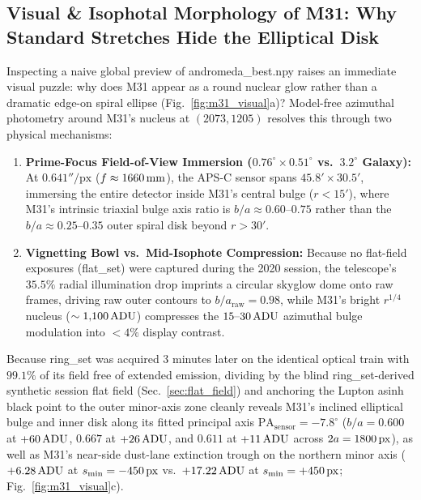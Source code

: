 \documentclass[10pt,twocolumn,letterpaper]{article}
\DeclareRobustCommand{\code}[1]{\texttt{#1}}
\def\code#1{#1}%
\begin{document}
\subsection{Visual \& Isophotal Morphology of M31: Why Standard Stretches Hide the Elliptical Disk}

Inspecting a naive global preview of \code{andromeda\_best.npy} raises an immediate visual puzzle: why does M31 appear as a round nuclear glow rather than a dramatic edge-on spiral ellipse (Fig.~\ref{fig:m31_visual}a)? Model-free azimuthal photometry around M31's nucleus at $(2073, 1205)$ resolves this through two physical mechanisms:
\begin{enumerate}
  \item \textbf{Prime-Focus Field-of-View Immersion ($0.76^\circ \times 0.51^\circ$ vs.\ $3.2^\circ$ Galaxy):} At $0.641''/\text{px}$ ($f \approx 1660\text{\,mm}$), the APS-C sensor spans $45.8' \times 30.5'$, immersing the entire detector inside M31's central bulge ($r < 15'$), where M31's intrinsic triaxial bulge axis ratio is $b/a \approx 0.60\text{--}0.75$ rather than the $b/a \approx 0.25\text{--}0.35$ outer spiral disk beyond $r > 30'$.
  \item \textbf{Vignetting Bowl vs.\ Mid-Isophote Compression:} Because no flat-field exposures (\code{flat\_set}) were captured during the 2020 session, the telescope's $35.5\%$ radial illumination drop imprints a circular skyglow dome onto raw frames, driving raw outer contours to $b/a_{\text{raw}} = 0.98$, while M31's bright $r^{1/4}$ nucleus ($\sim 1{,}100\text{\,ADU}$) compresses the $15\text{--}30\text{\,ADU}$ azimuthal bulge modulation into $<4\%$ display contrast.
\end{enumerate}

Because \code{ring\_set} was acquired 3 minutes later on the identical optical train with $99.1\%$ of its field free of extended emission, dividing by the blind \code{ring\_set}-derived synthetic session flat field (Sec.~\ref{sec:flat_field}) and anchoring the Lupton \code{asinh} black point to the outer minor-axis zone cleanly reveals M31's inclined elliptical bulge and inner disk along its fitted principal axis $\text{PA}_{\text{sensor}} = -7.8^\circ$ ($b/a = 0.600$ at $+60\text{\,ADU}$, $0.667$ at $+26\text{\,ADU}$, and $0.611$ at $+11\text{\,ADU}$ across $2a = 1800\text{\,px}$), as well as M31's near-side dust-lane extinction trough on the northern minor axis ($+6.28\text{\,ADU}$ at $s_{\min} = -450\text{\,px}$ vs.\ $+17.22\text{\,ADU}$ at $s_{\min} = +450\text{\,px}$; Fig.~\ref{fig:m31_visual}c).
\end{document}
